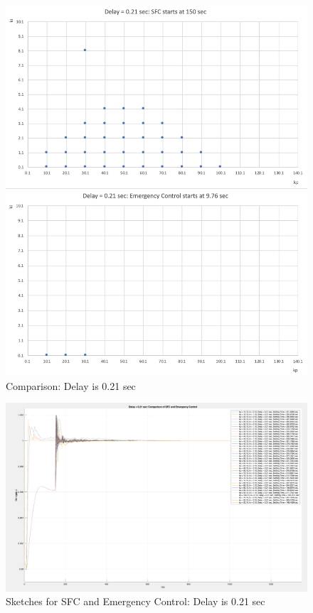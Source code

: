 \begin{figure}[htbp]
\centering
\includegraphics[width = .891\textwidth]{figure/6_4_copare_21.png}
\caption{Comparison: Delay is 0.21 sec}
\label{6_4_copare_21}
\end{figure}


\begin{figure}[htbp]
\centering
\includegraphics[width = .891\textwidth]{figure/6_4_CompaPlots_21.png}
\caption{Sketches for SFC and Emergency Control: Delay is 0.21 sec}
\label{6_4_CompaPlots_21}
\end{figure}




